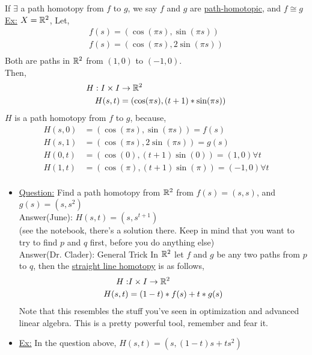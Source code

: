 \documentclass[../notes.tex]{subfiles}
\begin{document}
    \begin{definition} If $\exists$ a path homotopy from $f$ to $g$, we say $f$ and $g$ are \underline{path-homotopic}, and $f\cong g$\\
        \underline{Ex:} $X=\mathbb{R}^2$, Let,
        \begin{align*}
            f(s)=(\cos(\pi s), \sin(\pi s))\\
            f(s)=(\cos(\pi s), 2\sin(\pi s))\\
        \end{align*}
        Both are paths in $\mathbb{R}^2$ from $(1,0)$ to $(-1,0)$.\\
        Then,
        \begin{align*}
            H: I\times I &\rightarrow \mathbb{R}^2\\
            H(s,t)&=(\cos(\pi s), (t+1)*\sin(\pi s))\\
        \end{align*}
        $H$ is a path homotopy from $f$ to $g$, because,
        \begin{align*}
            H(s,0)&=(\cos(\pi s), \sin(\pi s))=f(s)\\
            H(s,1)&=(\cos(\pi s), 2\sin(\pi s))=g(s)\\
            H(0,t)&=(\cos(0), (t+1)\sin(0))=(1,0)\forall t\\
            H(1,t)&=(\cos(\pi), (t+1)\sin(\pi))=(-1,0)\forall t\\
        \end{align*}
    \end{definition}
    \begin{itemize}
        \item \underline{Question:} Find a path homotopy from $\mathbb{R}^2$ from $f(s)=(s,s)$, and $g(s)=(s,s^2)$\\
            Answer(June): $H(s,t)=(s,s^{t+1})$\\
            (see the notebook, there's a solution there. Keep in mind that you want to try to find $p$ and $q$ first, before you do anything else)\\
            Answer(Dr. Clader): General Trick In $\mathbb{R}^2$ let $f$ and $g$ be any two paths from $p$ to $q$, then the
            \underline{straight line homotopy} is as follows,
            \begin{align*}
                H: &I \times I \rightarrow \mathbb{R}^2\\
                H(s,t)&=(1-t)*f(s)+t*g(s)\\
            \end{align*}
            Note that this resembles the stuff you've seen in optimization and advanced linear algebra. This is a pretty powerful tool,
            remember and fear it.
        \item \underline{Ex:} In the question above, $H(s, t)=(s, (1-t)s+ts^2)$
    \end{itemize}
\end{document}
